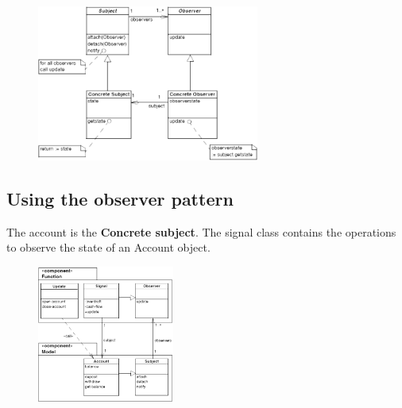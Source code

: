 \begin{figure}[H]
    \centering
   \includegraphics[width=0.65\textwidth]{figures/explorepatterns.png}
\end{figure}

\subsection{Using the observer pattern}

The account is the \textbf{Concrete subject}. The signal class contains the operations to observe the state of an Account object.

\begin{figure}[H]
    \centering
   \includegraphics[width=0.4\textwidth]{figures/observerpattern.png}
\end{figure}


